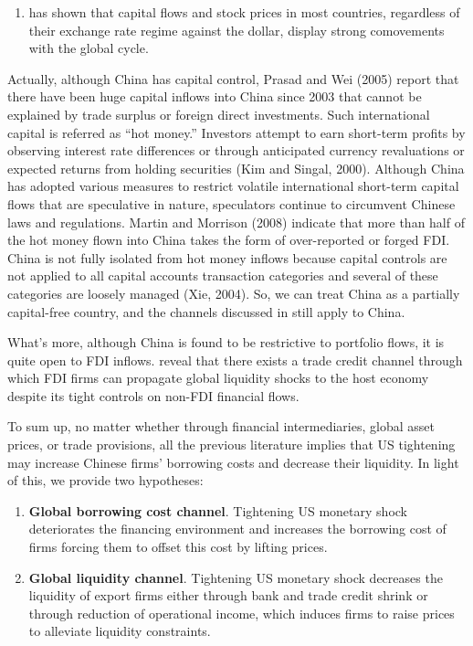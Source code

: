 \documentclass[12pt]{article}
\begin{document}
\begin{enumerate}
\item \cite{RePEc:fip:fedkpr:y:2013:x:9} has shown that capital flows and stock prices in most countries, regardless of their exchange rate regime against the dollar, display strong comovements with the global cycle.

\end{enumerate}


Actually, although China has capital control, Prasad and Wei (2005) report that there have been huge capital inflows into China since 2003 that cannot be explained by trade surplus or foreign direct investments. Such international capital is referred as “hot money.” Investors attempt to earn short-term profits by observing interest rate differences or through anticipated currency revaluations or expected returns from holding securities (Kim and Singal, 2000). Although China has adopted various measures to restrict volatile international short-term capital flows that are speculative in nature, speculators continue to circumvent Chinese laws and regulations. Martin and Morrison (2008) indicate that more than half of the hot money flown into China takes the form of over-reported or forged FDI. China is not fully isolated from hot money inflows because capital controls are not applied to all capital accounts transaction categories and several of these categories are loosely managed (Xie, 2004). So, we can treat China as a partially capital-free country, and the channels discussed in \cite{miranda2020us} still apply to China.

What's more, although China is found to be restrictive to portfolio flows, it is quite open to FDI inflows. \cite{lin2018foreign} reveal that there exists a trade credit channel through which FDI firms can propagate global liquidity shocks to the host economy despite its tight controls on non-FDI financial flows.

 
To sum up, no matter whether through financial intermediaries, global asset prices, or trade provisions, all the previous literature implies that US tightening may increase Chinese firms' borrowing costs and decrease their liquidity. In light of this, we provide two hypotheses:
\begin{enumerate}
    \item \textbf{Global borrowing cost channel}. Tightening US monetary shock deteriorates the financing environment and increases the borrowing cost of firms forcing them to offset this cost by lifting prices.
    \item \textbf{Global liquidity channel}. Tightening US monetary shock decreases the liquidity of export firms either through bank and trade credit shrink or through reduction of operational income, which induces firms to raise prices to alleviate liquidity constraints.
\end{enumerate}
\end{document}
